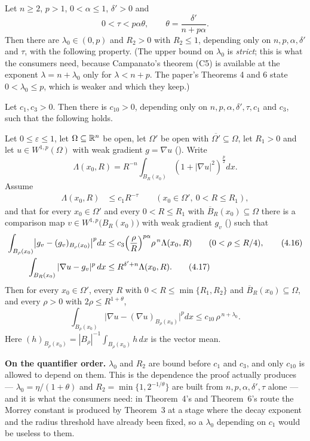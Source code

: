 \begin{helper}
Let $n\ge2$, $p>1$, $0<\alpha\le1$, $\delta'>0$ and
\[
0<\tau<p\alpha\theta,\qquad \theta=\frac{\delta'}{n+p\alpha} .
\]
Then there are $\lambda_0\in(0,p)$ and $R_2>0$ with $R_2\le1$, depending only on
$n,p,\alpha,\delta'$ and $\tau$, with the following property.  (The upper bound
on $\lambda_0$ is \emph{strict}; this is what the consumers need, because
Campanato's theorem (C5) is available at the exponent $\lambda=n+\lambda_0$ only
for $\lambda<n+p$.  The paper's Theorems 4 and 6 state $0<\lambda_0\le p$, which
is weaker and which they keep.)

Let $c_1,c_3>0$.  Then there is $c_{10}>0$, depending only on
$n,p,\alpha,\delta',\tau,c_1$ and $c_3$, such that the following holds.

Let $0\le\varepsilon\le1$, let $\Omega\subseteq\mathbb{R}^n$ be open, let $\Omega'$ be
open with $\overline{\Omega'}\subseteq\Omega$, let $R_1>0$ and let
$u\in W^{1,p}(\Omega)$ with weak gradient $g=\nabla u$ ().
Write
\[
\Lambda(x_0,R)=R^{-n}\int_{B_R(x_0)}(1+|\nabla u|^2)^{\frac p2}dx .
\]
Assume
\begin{align}
\Lambda(x_0,R)&\le c_1R^{-\tau}\qquad (x_0\in\Omega',\ 0<R\le R_1),\tag{4.15}
\end{align}
and that for every $x_0\in\Omega'$ and every $0<R\le R_1$ with
$\overline B_R(x_0)\subseteq\Omega$ there is a comparison map
$v\in W^{1,p}\bigl(B_R(x_0)\bigr)$ with weak gradient $g_v$
() such that
\begin{align}
\int_{B_\rho(x_0)}\bigl|g_v-(g_v)_{B_\rho(x_0)}\bigr|^p dx
&\le c_3\Bigl(\frac\rho R\Bigr)^{p\alpha}\rho^{\,n}\Lambda(x_0,R)
\qquad(0<\rho\le R/4),\tag{4.16}\\
\int_{B_R(x_0)}|\nabla u-g_v|^p\,dx&\le R^{\delta'+n}\Lambda(x_0,R).\tag{4.17}
\end{align}
Then for every $x_0\in\Omega'$, every $R$ with $0<R\le\min\{R_1,R_2\}$ and
$\overline B_R(x_0)\subseteq\Omega$, and every $\rho>0$ with
$2\rho\le R^{1+\theta}$,
\[
\int_{B_\rho(x_0)}\bigl|\nabla u-(\nabla u)_{B_\rho(x_0)}\bigr|^p dx
\le c_{10}\,\rho^{\,n+\lambda_0}.
\tag{4.19}
\]
Here $(h)_{B_\rho(x_0)}=|B_\rho|^{-1}\int_{B_\rho(x_0)}h\,dx$ is the vector mean.

\noindent\textbf{On the quantifier order.}  $\lambda_0$ and $R_2$ are bound
before $c_1$ and $c_3$, and only $c_{10}$ is allowed to depend on them.  This is
the dependence the proof actually produces --- $\lambda_0=\eta/(1+\theta)$ and
$R_2=\min\{1,2^{-1/\theta}\}$ are built from $n,p,\alpha,\delta',\tau$ alone ---
and it is what the consumers need: in Theorem~4's and Theorem~6's route the
Morrey constant is produced by Theorem~3 at a stage where the decay exponent and
the radius threshold have already been fixed, so a $\lambda_0$ depending on
$c_1$ would be useless to them.


\end{helper}
